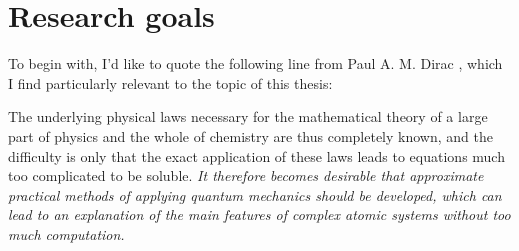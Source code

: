 \section{Research goals}

To begin with, I'd like to quote the following line from Paul A. M. Dirac \citep{diracQuantumMechanicsManyelectron1997}, which I find particularly relevant to the topic of this thesis:

\begin{displayquote}
    The underlying physical laws necessary for the mathematical theory of a large part of physics and the whole of chemistry are thus completely known, and the difficulty is only that the exact application of these laws leads to equations much too complicated to be soluble. \textit{It therefore becomes desirable that approximate practical methods of applying quantum mechanics should be developed, which can lead to an explanation of the main features of complex atomic systems without too much computation.}
\end{displayquote}


